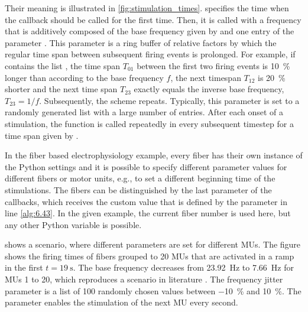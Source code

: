 Their meaning is illustrated in \cref{fig:stimulation_times}.  specifies the time when the callback should be called for the first time. Then, it is called with a frequency that is additively composed of the base frequency given by  and one entry of the parameter . This parameter is a ring buffer of relative factors by which the regular time span between subsequent firing events is prolonged. For example, if  contains the list \code{[0.1,-0.2,0.0]}, the time span $T_{01}$ between the first two firing events is \SI{10}{\percent} longer than according to the base frequency $f$, the next timespan $T_{12}$ is \SI{20}{\percent} shorter and the next time span $T_{23}$ exactly equals the inverse base frequency, $T_{23} = 1/f$. Subsequently, the scheme repeats. Typically, this parameter is set to a randomly generated list with a large number of entries.
After each onset of a stimulation, the  function is called repeatedly in every subsequent timestep for a time span given by . 

In the fiber based electrophysiology example, every fiber has their own instance of the Python settings and it is possible to specify different parameter values for different fibers or motor units, e.g., to set a different beginning time of the stimulations. The fibers can be distinguished by the last parameter of the callbacks, which receives the custom value that is defined by the  parameter in line \ref{alg:6.43}. In the given example, the current fiber number is used here, but any other Python variable is possible.

 shows a scenario, where different parameters are set for different MUs. The figure shows the firing times of fibers grouped to 20 MUs that are activated in a ramp in the first $t=\SI{19}{\second}$. The base frequency decreases from \SI{23.92}{\hertz} to \SI{7.66}{\hertz} for MUs 1 to 20, which reproduces a scenario in literature \cite{Klotz2020}. The frequency jitter parameter is a list of 100 randomly chosen values between \SI{-10}{\percent} and \SI[retain-explicit-plus]{+10}{\percent}. The  parameter enables the stimulation of the next MU every second.

